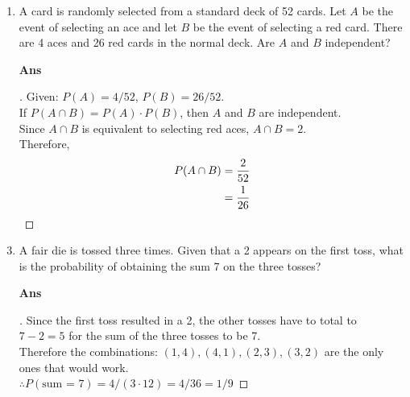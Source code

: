 \documentclass[paper=usletter, fontsize=12pt]{article}
\begin{document}
\begin{enumerate}
        \item  A card is randomly selected from a standard deck of 52 cards.
        Let $A$ be the event of selecting an ace and let $B$ be the event of
        selecting a red card. There are 4 aces and 26 red cards in the normal
        deck. Are $A$ and $B$ independent?
        \item[\textbf{Ans}]
        \begin{proof}[\unskip\nopunct]
            Given: $P(A) = 4/52$, $P(B) = 26/52$. \\
            If $P(A \cap B) = P(A) \cdot P(B)$, then $A$ and $B$ are
            independent. \\
            Since $A \cap B$ is equivalent to selecting red aces, $A \cap B =
            2$. \\
            Therefore,
            \begin{align*}
                P(A \cap B) & = \frac{2}{52} \\
                & = \frac{1}{26} \qedhere
            \end{align*}
        \end{proof}
        \vspace{0.2in}

        \item A fair die is tossed three times. Given that a 2 appears on the
        first toss, what is the probability of obtaining the sum 7 on the three
        tosses?
        \item[\textbf{Ans}]
        \begin{proof}[\unskip\nopunct]
            Since the first toss resulted in a 2, the other tosses have to
            total to $7 - 2 = 5$ for the sum of the three tosses to be 7. \\
            Therefore the combinations: $(1,4), (4, 1), (2,3), (3,2)$ are the
            only ones that would work. \\ $\therefore P(\text{sum = 7}) = 4/(3
            \cdot 12) = 4/36 = 1/9$ \qedhere
        \end{proof}
        \vspace{0.2in}


\end{enumerate}
\end{document}
